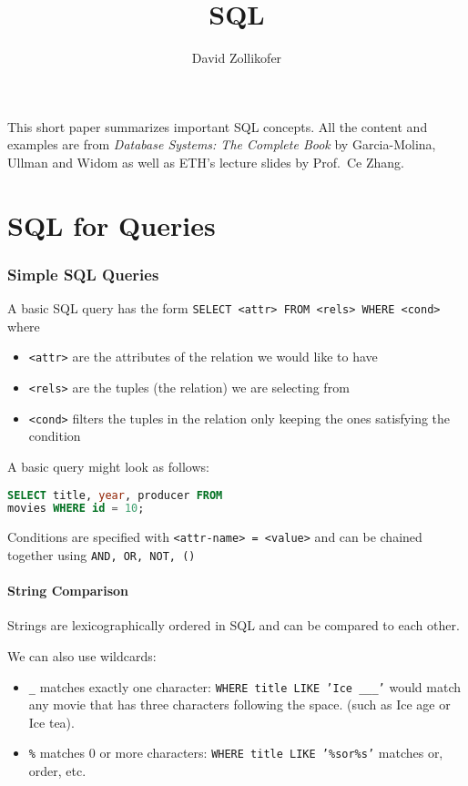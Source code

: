 \documentclass{sciposter}
\title{\huge{SQL}}
\author{\Large David Zollikofer}
\renewcommand{\t}[1]{\texttt{#1}}
\begin{document}
\maketitle

\begin{multicols}{3}

This short paper summarizes important SQL concepts. All the content and examples are from \textit{Database Systems: The Complete Book} by Garcia-Molina, Ullman and Widom as well as ETH's lecture slides by Prof.\ Ce Zhang.

\part{SQL for Queries}

\section*{Simple SQL Queries}

A basic SQL query has the form \t{SELECT <attr> FROM <rels> WHERE <cond>} where 
\begin{itemize}
	\item \t{<attr>} are the attributes of the relation we would like to have
	\item \t{<rels>} are the tuples (the relation) we are selecting from
	\item \t{<cond>} filters the tuples in the relation only keeping the ones satisfying the condition
\end{itemize}

A basic query might look as follows:

\begin{lstlisting}[language=SQL]
SELECT title, year, producer FROM
movies WHERE id = 10;
\end{lstlisting}

Conditions are specified with \t{<attr-name> = <value>} and can be chained together using \t{AND, OR, NOT, ()}

\subsection*{String Comparison}

Strings are lexicographically ordered in SQL and can be compared to each other.

We can also use wildcards:
\begin{itemize}
	\item \t{\_} matches exactly one character: \t{WHERE title LIKE 'Ice \_\_\_'} would match any movie that has three characters following the space. (such as Ice age or Ice tea).
	\item\t{\%} matches 0 or more characters: \t{WHERE title LIKE '\%sor\%s'} matches or, order, etc.
\end{itemize}



\end{multicols}
\end{document}
